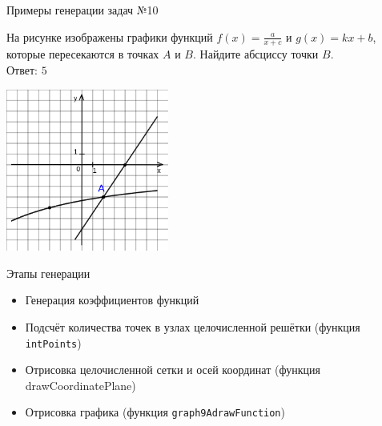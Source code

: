 \documentclass[aspectratio=169]{beamer}
\begin{document}
\begin{frame}{Примеры генерации задач №10}
    \begin{multicols}{2}
        На рисунке изображены графики функций $f(x)=\frac{a}{x+c}$ и $g(x)=kx+b$, которые пересекаются в точках $A$ и $B$. Найдите абсциссу точки $B$.\\

        Ответ: $5$

        \includegraphics[width=0.4\textwidth]{images/17222136364202n0.png}
    \end{multicols}
    

\end{frame}

\begin{frame}{Этапы генерации}
    \begin{itemize}
        \item Генерация коэффициентов функций
        \item Подсчёт количества точек в узлах целочисленной решётки (функция \texttt{intPoints})
        \item Отрисовка целочисленной сетки и осей координат (функция drawCoordinatePlane)
        \item Отрисовка графика (функция \texttt{graph9AdrawFunction})
    \end{itemize}
    
\end{frame}
\end{document}
